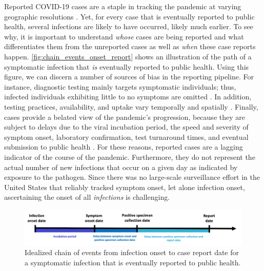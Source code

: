 \documentclass{article}
\begin{document}
Reported COVID-19 cases are a staple in tracking the pandemic at varying
geographic resolutions \citep{dong2020interactive, nyt2020corona,
wp2020tracking}. Yet, for every case that is eventually reported to public
health, several infections are likely to have occurred, likely much earlier. To
see why, it is important to understand \emph{whose} cases are being reported and
what differentiates them from the unreported cases as well as \emph{when} these
case reports happen. \autoref{fig:chain_events_onset_report} shows an
illustration of the path of a symptomatic infection that \emph{is} eventually
reported to public health. Using this figure, we can discern a number of sources
of bias in the reporting pipeline. For instance, diagnostic testing mainly
targets symptomatic individuals; thus, infected individuals exhibiting little to
no symptoms are omitted \citep{cdc2022estimated}. In addition, testing
practices, availability, and uptake vary temporally and spatially
\citep{pitzer2021impact, ecdc2020strategies, hitchings2021usefulness}. Finally,
cases provide a belated view of the pandemic's progression, because they are
subject to delays due to the viral incubation period, the speed and severity of
symptom onset, laboratory confirmation, test turnaround times, and eventual
submission to public health \citep{pellis2021challenges, wash2020dash}. For
these reasons, reported cases are a lagging indicator of the course of the
pandemic. Furthermore, they do not represent the actual number of new infections
that occur on a given day as indicated by exposure to the pathogen. Since there
was no large-scale surveillance effort in the United States that reliably
tracked symptom onset, let alone infection onset, ascertaining the onset of all
\emph{infections} is challenging.

\begin{figure}[!tb]
\centering
    \includegraphics[width=.99\textwidth]{Chain_of_events_onset_report.pdf} 
    \caption{Idealized chain of events from infection onset to case report date 
    for a symptomatic infection that is eventually reported to public health.}
    \label{fig:chain_events_onset_report}
\end{figure}

\end{document}
